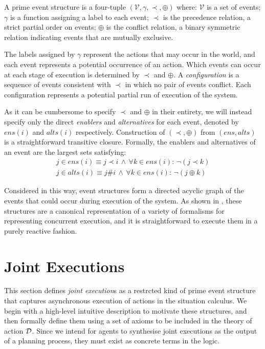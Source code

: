 \begin{defnL}
 A prime event structure is a
four-tuple $(\mathcal{V},\gamma,\prec,\oplus)$ where: $\mathcal{V}$
is a set of events; $\gamma$ is a function assigning a label to each
event; $\prec$ is the precedence relation, a strict partial order
on events; $\oplus$ is the conflict relation, a binary symmetric
relation indicating events that are mutually exclusive. 
\end{defnL}
The labels assigned by $\gamma$ represent the actions that may occur
in the world, and each event represents a potential occurrence of
an action. Which events can occur at each stage of execution is determined
by $\prec$ and $\oplus$. A \emph{configuration} is a sequence of
events consistent with $\prec$ in which no pair of events conflict.
Each configuration represents a potential partial run of execution
of the system.

As it can be cumbersome to specify $\prec$ and $\oplus$ in their
entirety, we will instead specify only the direct \emph{enablers}
and \emph{alternatives} for each event, denoted by $ens(i)$ and $alts(i)$
respectively. Construction of $(\prec,\oplus)$ from $(ens,alts)$
is a straightforward transitive closure. Formally, the enablers and
alternatives of an event are the largest sets satisfying:\begin{gather*}
j\in ens(i)\equiv j\prec i\,\wedge\,\forall k\in ens(i):\,\neg(j\prec k)\\
j\in alts(i)\equiv j\#i\,\wedge\,\forall k\in ens(i):\,\neg(j\oplus k)\end{gather*}


Considered in this way, event structures form a directed acyclic graph
of the events that could occur during execution of the system. As
shown in \citep{pratt91modeling_conc_with_geom}, these structures
are a canonical representation of a variety of formalisms for representing
concurrent execution, and it is straightforward to execute them in
a purely reactive fashion.


\section{Joint Executions\label{sec:JointExec:JEs}}

This section defines \emph{joint execution}s as a restrcted kind of
prime event structure that captures asynchronous execution of actions
in the situation calculus. We begin with a high-level intuitive description
to motivate these structures, and then formally define them using
a set of axioms to be included in the theory of action $\mathcal{D}$. Since
we intend for agents to synthesise joint executions as the output
of a planning process, they must exist as concrete terms in the logic.

